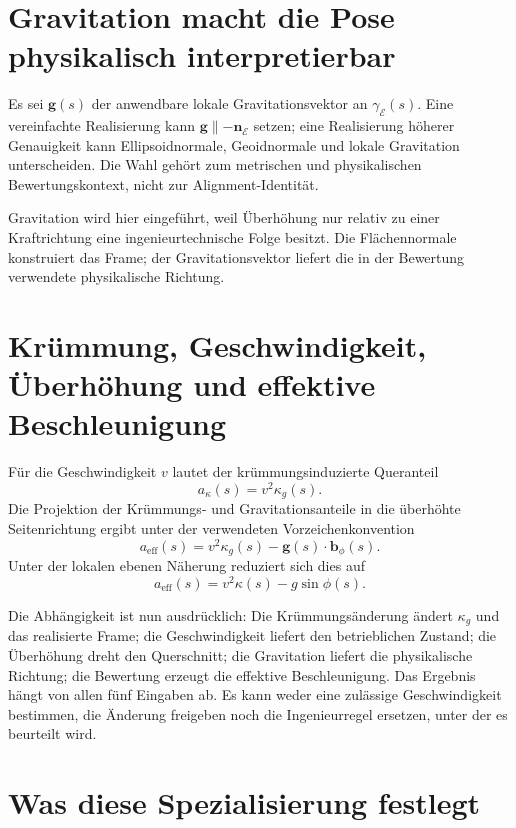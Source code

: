 \section{Gravitation macht die Pose physikalisch interpretierbar}

Es sei \(\mathbf g(s)\) der anwendbare lokale Gravitationsvektor an
\(\gamma_{\mathcal E}(s)\). Eine vereinfachte Realisierung kann
\(\mathbf g\parallel-\mathbf n_{\mathcal E}\) setzen; eine Realisierung
höherer Genauigkeit kann Ellipsoidnormale, Geoidnormale und lokale Gravitation
unterscheiden. Die Wahl gehört zum metrischen und physikalischen
Bewertungskontext, nicht zur Alignment-Identität.

Gravitation wird hier eingeführt, weil Überhöhung nur relativ zu einer
Kraftrichtung eine ingenieurtechnische Folge besitzt. Die Flächennormale
konstruiert das Frame; der Gravitationsvektor liefert die in der Bewertung
verwendete physikalische Richtung.

\section{Krümmung, Geschwindigkeit, Überhöhung und effektive Beschleunigung}

Für die Geschwindigkeit \(v\) lautet der krümmungsinduzierte Queranteil
\[
a_{\kappa}(s)=v^2\kappa_g(s).
\]
Die Projektion der Krümmungs- und Gravitationsanteile in die überhöhte
Seitenrichtung ergibt unter der verwendeten Vorzeichenkonvention
\[
a_{\mathrm{eff}}(s)
=v^2\kappa_g(s)
-\mathbf g(s)\cdot\mathbf b_{\phi}(s).
\]
Unter der lokalen ebenen Näherung reduziert sich dies auf
\[
a_{\mathrm{eff}}(s)
=v^2\kappa(s)-g\sin\phi(s).
\]

Die Abhängigkeit ist nun ausdrücklich: Die Krümmungsänderung ändert
\(\kappa_g\) und das realisierte Frame; die Geschwindigkeit liefert den
betrieblichen Zustand; die Überhöhung dreht den Querschnitt; die Gravitation
liefert die physikalische Richtung; die Bewertung erzeugt die effektive
Beschleunigung. Das Ergebnis hängt von allen fünf Eingaben ab. Es kann weder
eine zulässige Geschwindigkeit bestimmen, die Änderung freigeben noch die
Ingenieurregel ersetzen, unter der es beurteilt wird.

\section{Was diese Spezialisierung festlegt}

